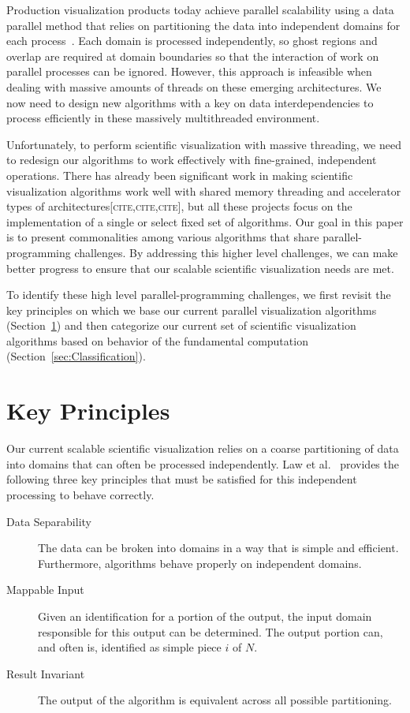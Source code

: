 \documentclass{sig-alternate}
\newcommand*{\lcite}[1]{~\cite{#1}}
\newcommand*{\scite}[1]{~\cite{#1}}
\newcommand{\etal}{et al.}
\newcommand{\fix}[1]{{\color{red}\textsc{[#1]}}}
\begin{document}
Production visualization products today achieve parallel scalability using
a data parallel method that relies on partitioning the data into
independent domains for each process\lcite{Ahrens2001}. Each domain is
processed independently, so ghost regions and overlap are required at
domain boundaries so that the interaction of work on parallel processes can
be ignored. However, this approach is infeasible when dealing with massive
amounts of threads on these emerging architectures. We now need to design
new algorithms with a key on data interdependencies to process efficiently
in these massively multithreaded environment.

Unfortunately, to perform scientific visualization with massive threading,
we need to redesign our algorithms to work effectively with fine-grained,
independent operations. There has already been significant work in making
scientific visualization algorithms work well with shared memory threading
and accelerator types of architectures\fix{cite,cite,cite}, but all these
projects focus on the implementation of a single or select fixed set of
algorithms. Our goal in this paper is to present commonalities among
various algorithms that share parallel-programming challenges. By
addressing this higher level challenges, we can make better progress to
ensure that our scalable scientific visualization needs are met.

To identify these high level parallel-programming challenges, we first
revisit the key principles on which we base our current parallel
visualization algorithms (Section~\ref{sec:KeyPrinciples}) and then
categorize our current set of scientific visualization algorithms based on
behavior of the fundamental computation
(Section~\ref{sec:Classification}).


\section{Key Principles}
\label{sec:KeyPrinciples}

\noindent
Our current scalable scientific visualization relies on a coarse
partitioning of data into domains that can often be processed
independently. Law \etal\scite{Law1999} provides the following three key
principles that must be satisfied for this independent processing to behave
correctly.

\begin{description}
\item[Data Separability] The data can be broken into domains in a way that
  is simple and efficient. Furthermore, algorithms behave properly on
  independent domains.
\item[Mappable Input] Given an identification for a portion of the output,
  the input domain responsible for this output can be determined. The
  output portion can, and often is, identified as simple piece $i$ of $N$.
\item[Result Invariant] The output of the algorithm is equivalent across
  all possible partitioning.
\end{description}
\end{document}
